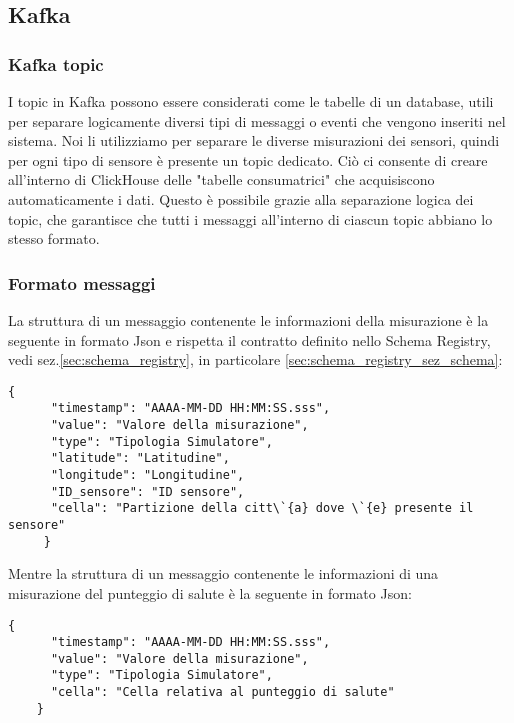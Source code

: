 \subsection{Kafka}
\subsubsection{Kafka topic}
I topic in Kafka possono essere considerati come le tabelle di un database, utili per separare logicamente diversi tipi di messaggi o eventi che vengono inseriti nel sistema. Noi li utilizziamo per separare le diverse misurazioni dei sensori, quindi per ogni tipo di sensore è presente un topic dedicato. Ciò ci consente di creare all'interno di ClickHouse delle "tabelle consumatrici" che acquisiscono automaticamente i dati. Questo è possibile grazie alla separazione logica dei topic, che garantisce che tutti i messaggi all'interno di ciascun topic abbiano lo stesso formato.
\subsubsection{Formato messaggi} \label{sec:formatoMessaggi}
La struttura di un messaggio contenente le informazioni della misurazione è la seguente in formato Json e rispetta il contratto definito nello Schema Registry, vedi sez.\ref{sec:schema_registry}, in particolare \ref{sec:schema_registry_sez_schema}:
\begin{lstlisting}[style=code]
    {
      "timestamp": "AAAA-MM-DD HH:MM:SS.sss", 
      "value": "Valore della misurazione",  
      "type": "Tipologia Simulatore",
      "latitude": "Latitudine",
      "longitude": "Longitudine",
      "ID_sensore": "ID sensore",
      "cella": "Partizione della citt\`{a} dove \`{e} presente il sensore" 
     }
\end{lstlisting}
Mentre la struttura di un messaggio contenente le informazioni di una misurazione del punteggio di salute è la seguente in formato Json:
\begin{lstlisting}[style=code]
    {
      "timestamp": "AAAA-MM-DD HH:MM:SS.sss", 
      "value": "Valore della misurazione",  
      "type": "Tipologia Simulatore",
      "cella": "Cella relativa al punteggio di salute"
    }
\end{lstlisting}


